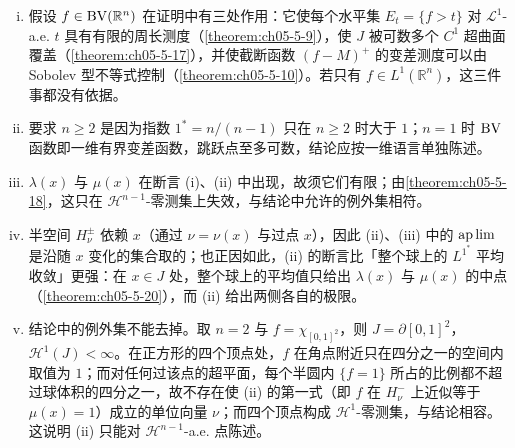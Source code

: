 \documentclass[../../main.tex]{subfiles}%
\begin{document}
\begin{remark}\label{remark:ch05-thm-5-19-条件}
\begin{enumerate}[(i)]
\item 假设 $f\in\mathrm{BV}(\mathbb{R}^n)$ 在证明中有三处作用：它使每个水平集 $E_t=\{f>t\}$ 对 $\mathcal{L}^1$-a.e. $t$ 具有有限的周长测度（\cref{theorem:ch05-5-9}），使 $J$ 被可数多个 $C^1$ 超曲面覆盖（\cref{theorem:ch05-5-17}），并使截断函数 $(f-M)^{+}$ 的变差测度可以由 Sobolev 型不等式控制（\cref{theorem:ch05-5-10}）。若只有 $f\in L^1(\mathbb{R}^n)$，这三件事都没有依据。%
\item 要求 $n\geqslant2$ 是因为指数 $1^{*}=n/(n-1)$ 只在 $n\geqslant2$ 时大于 $1$；$n=1$ 时 $\mathrm{BV}$ 函数即一维有界变差函数，跳跃点至多可数，结论应按一维语言单独陈述。
\item $\lambda(x)$ 与 $\mu(x)$ 在断言 (i)、(ii) 中出现，故须它们有限；由\cref{theorem:ch05-5-18}，这只在 $\mathcal{H}^{n-1}$-零测集上失效，与结论中允许的例外集相符。%
\item 半空间 $H_\nu^{\pm}$ 依赖 $x$（通过 $\nu=\nu(x)$ 与过点 $x$），因此 (ii)、(iii) 中的 $\operatorname*{ap\,lim}$ 是沿随 $x$ 变化的集合取的；也正因如此，(ii) 的断言比「整个球上的 $L^{1^{*}}$ 平均收敛」更强：在 $x\in J$ 处，整个球上的平均值只给出 $\lambda(x)$ 与 $\mu(x)$ 的中点（\cref{theorem:ch05-5-20}），而 (ii) 给出两侧各自的极限。 %
\item 结论中的例外集不能去掉。取 $n=2$ 与 $f=\chi_{[0,1]^{2}}$，则 $J=\partial[0,1]^{2}$，$\mathcal{H}^{1}(J)<\infty$。在正方形的四个顶点处，$f$ 在角点附近只在四分之一的空间内取值为 $1$；而对任何过该点的超平面，每个半圆内 $\{f=1\}$ 所占的比例都不超过球体积的四分之一，故不存在使 (ii) 的第一式（即 $f$ 在 $H_\nu^-$ 上近似等于 $\mu(x)=1$）成立的单位向量 $\nu$；而四个顶点构成 $\mathcal{H}^{1}$-零测集，与结论相容。这说明 (ii) 只能对 $\mathcal{H}^{n-1}$-a.e. 点陈述。
\end{enumerate}
\end{remark}
\end{document}
